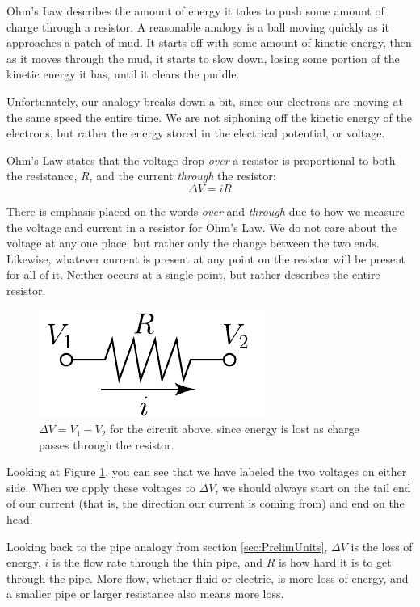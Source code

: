 Ohm's Law describes the amount of energy it takes to push some amount of charge through a resistor.  A reasonable analogy is a ball moving quickly as it approaches a patch of mud.  It starts off with some amount of kinetic energy, then as it moves through the mud, it starts to slow down, losing some portion of the kinetic energy it has, until it clears the puddle.

Unfortunately, our analogy breaks down a bit, since our electrons are moving at the same speed the entire time.  We are not siphoning off the kinetic energy of the electrons, but rather the energy stored in the electrical potential, or voltage.

Ohm's Law states that the voltage drop {\it over} a resistor is proportional to both the resistance, $R$, and the current {\it through} the resistor:
\begin{equation}
  \Delta V = iR
\end{equation}

There is emphasis placed on the words {\it over} and {\it through} due to how we measure the voltage and current in a resistor for Ohm's Law.  We do not care about the voltage at any one place, but rather only the change between the two ends.  Likewise, whatever current is present at any point on the resistor will be present for all of it.  Neither occurs at a single point, but rather describes the entire resistor.

\begin{figure}
  \includegraphics{figures/ohmsLaw}
  \caption{$\Delta V = V_1 - V_2$ for the circuit above, since energy is lost as charge passes through the resistor.}
  \label{fig:ohmsLaw}
\end{figure}

Looking at Figure \ref{fig:ohmsLaw}, you can see that we have labeled the two voltages on either side.  When we apply these voltages to $\Delta V$, we should always start on the tail end of our current (that is, the direction our current is coming from) and end on the head.  

Looking back to the pipe analogy from section \ref{sec:PrelimUnits}, $\Delta V$ is the loss of energy, $i$ is the flow rate through the thin pipe, and $R$ is how hard it is to get through the pipe.  More flow, whether fluid or electric, is more loss of energy, and a smaller pipe or larger resistance also means more loss.
